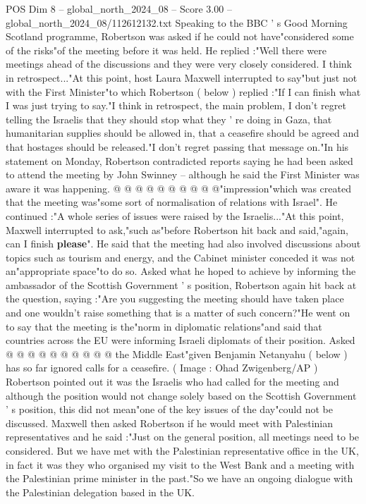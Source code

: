 \begin{textsample}{POS Dim 8 – global\_north\_2024\_08 – Score 3.00 – global\_north\_2024\_08/112612132.txt}  \label{ex:f8_pos_327}
Speaking to the BBC ' s Good Morning Scotland programme, Robertson was asked if he could not have"considered some of the risks"of the meeting before it was held.
He replied :"Well there were meetings ahead of the discussions and they were very closely considered.
I think in retrospect..."At this point, host Laura Maxwell interrupted to say"but just not with the First Minister"to which Robertson ( below ) replied :"If I can finish what I was just trying to say."I think in retrospect, the main problem, I don't regret telling the Israelis that they should stop what they ' re doing in Gaza, that humanitarian supplies should be allowed in, that a ceasefire should be agreed and that hostages should be released."I don't regret passing that message on."In his statement on Monday, Robertson contradicted reports saying he had been asked to attend the meeting by John Swinney -- although he said the First Minister was aware it was happening. @ @ @ @ @ @ @ @ @ @"impression"which was created that the meeting was"some sort of normalisation of relations with Israel".
He continued :"A whole series of issues were raised by the Israelis..."At this point, Maxwell interrupted to ask,"such as"before Robertson hit back and said,"again, can I finish \textbf{please}".
He said that the meeting had also involved discussions about topics such as tourism and energy, and the Cabinet minister conceded it was not an"appropriate space"to do so.
Asked what he hoped to achieve by informing the ambassador of the Scottish Government ' s position, Robertson again hit back at the question, saying :"Are you suggesting the meeting should have taken place and one wouldn't raise something that is a matter of such concern?"He went on to say that the meeting is the"norm in diplomatic relations"and said that countries across the EU were informing Israeli diplomats of their position.
Asked @ @ @ @ @ @ @ @ @ @ the Middle East"given Benjamin Netanyahu ( below ) has so far ignored calls for a ceasefire. ( Image : Ohad Zwigenberg/AP ) Robertson pointed out it was the Israelis who had called for the meeting and although the position would not change solely based on the Scottish Government ' s position, this did not mean"one of the key issues of the day"could not be discussed.
Maxwell then asked Robertson if he would meet with Palestinian representatives and he said :"Just on the general position, all meetings need to be considered.
But we have met with the Palestinian representative office in the UK, in fact it was they who organised my visit to the West Bank and a meeting with the Palestinian prime minister in the past."So we have an ongoing dialogue with the Palestinian delegation based in the UK.

\end{textsample}
